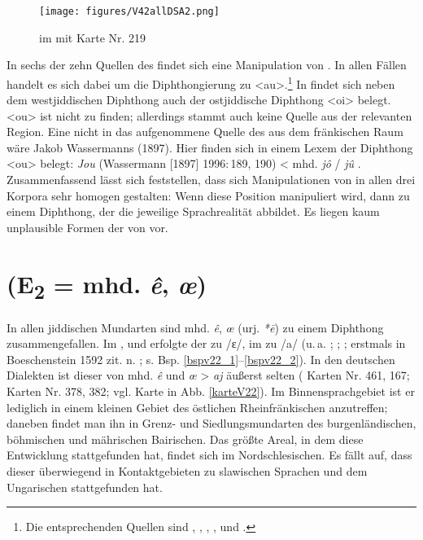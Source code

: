  
  \begin{figure}[h!]
		\centering
\texttt{[image: figures/V42allDSA2.png]}
		\caption{\label{karteV42}   im  mit  Karte Nr. 219}
		\end{figure}
\FloatBarrier
 


   
   
 In sechs der zehn Quellen des  findet sich eine Manipulation von . In allen Fällen handelt es sich dabei um die Diphthongierung zu  <au>.\footnote{Die entsprechenden Quellen sind , , , ,  und .} In  findet sich neben dem westjiddischen Diphthong auch der ostjiddische Diphthong  <oi> belegt. <ou> ist nicht zu finden; allerdings stammt auch keine Quelle aus der relevanten Region. Eine nicht in das  aufgenommene Quelle des  aus dem fränkischen Raum wäre Jakob Wassermanns  (1897). Hier finden sich in einem Lexem der Diphthong <ou> belegt: \textit{Jou} (Wassermann [1897] 1996:\,189, 190)  < mhd. \textit{jô} / \textit{jû} \parencite[Bd. 1, Sp. 1481]{Lexer1992}.\\
 


Zusammenfassend lässt sich feststellen, dass sich Manipulationen von  in allen drei Korpora sehr homogen gestalten: Wenn diese Position manipuliert wird, dann zu einem Diphthong, der die jeweilige Sprachrealität abbildet. Es liegen kaum unplausible Formen der  von  vor. \\ 
 \FloatBarrier

   
 \section{ (E\textsubscript{2} = mhd. \textit{ê}, \textit{œ})}\label{phonV22}
 In allen jiddischen Mundarten sind mhd. \textit{ê}, \textit{œ} (urj. \textit{*\=e\textlengthmark}) zu einem Diphthong zusammengefallen. Im ,  und  erfolgte der  zu /ɛ\textsubarch{\textsci}/, im  zu /a\textsubarch{\textsci}/ (u.\,a.  \textcite[72]{Herzog1992};  \cite{Timm1987}; \cite{Beider2010}; erstmals in Boeschenstein 1592 zit. n. \cite[3]{Mieses1915}; s. Bsp. \ref{bspv22_1}–\ref{bspv22_2}). In den deutschen Dialekten ist dieser  von mhd. \textit{ê} und \textit{œ} > \textit{aj} äußerst selten ( Karten Nr. 461, 167;  Karten Nr. 378, 382; vgl. Karte in Abb. \ref{karteV22}). Im Binnensprachgebiet ist er lediglich in einem kleinen Gebiet des östlichen Rheinfränkischen anzutreffen; daneben findet man ihn in Grenz- und Siedlungsmundarten des burgenländischen, böhmischen und mährischen Bairischen. Das größte Areal, in dem diese Entwicklung stattgefunden hat, findet sich im Nordschlesischen. Es fällt auf, dass dieser  überwiegend in Kontaktgebieten zu slawischen Sprachen und dem Ungarischen stattgefunden hat.\\
 
